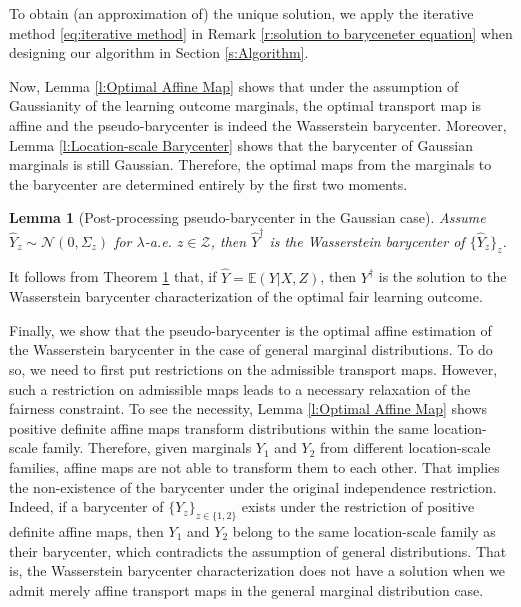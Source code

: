 \documentclass[twoside,11pt]{article}
\newtheorem{lem}{Lemma}[section]{\bfseries}{\itshape}
\begin{document}
To obtain (an approximation of) the unique solution, we apply the iterative method \eqref{eq:iterative method} in Remark \ref{r:solution to baryceneter equation} when designing our algorithm in Section \ref{s:Algorithm}.

Now, Lemma \ref{l:Optimal Affine Map} shows that under the assumption of Gaussianity of the learning outcome marginals, the optimal transport map is affine and the pseudo-barycenter is indeed the Wasserstein barycenter. Moreover, Lemma \ref{l:Location-scale Barycenter} shows that the barycenter of Gaussian marginals is still Gaussian. Therefore, the optimal maps from the marginals to the barycenter are determined entirely by the first two moments.

\begin{lem}[Post-processing pseudo-barycenter  in the Gaussian case] \label{l:Post-processing Pseudo-barycenter Characterization in Gaussian Case}
Assume $\hat{Y}_z \sim \mathcal{N}(0,\Sigma_z)$ for $\lambda$-a.e. $z \in \mathcal{Z}$, then $\hat{Y}^{\dag}$ is the Wasserstein barycenter of $\{\hat{Y}_z\}_z$.
\end{lem}

It follows from Theorem \ref{l:Post-processing Pseudo-barycenter Characterization in Gaussian Case} that, if $\hat{Y} = \mathbb{E}(Y|X,Z)$, then $Y^{\dag}$ is the solution to the Wasserstein barycenter characterization of the optimal fair learning outcome.

Finally, we show that the pseudo-barycenter is the optimal affine estimation of the Wasserstein barycenter in the case of general marginal distributions. To do so, we need to first put restrictions on the admissible transport maps. However, such a restriction on admissible maps leads to a necessary relaxation of the fairness constraint. To see the necessity, Lemma \ref{l:Optimal Affine Map} shows positive definite affine maps transform distributions within the same location-scale family. Therefore, given marginals $Y_1$ and $Y_2$ from different location-scale families, affine maps are not able to transform them to each other. That implies the non-existence of the barycenter under the original independence restriction. Indeed, if a barycenter of $\{Y_z\}_{z \in \{1,2\}}$ exists under the restriction of positive definite affine maps, then $Y_1$ and $Y_2$ belong to the same location-scale family as their barycenter, which contradicts the assumption of general distributions.  That is, the Wasserstein barycenter characterization does not have a solution when we admit merely affine transport maps in the general marginal distribution case.
\end{document}
